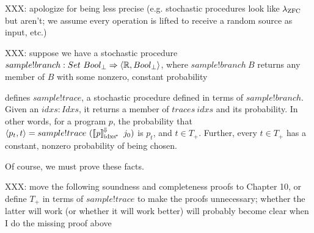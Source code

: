 XXX: apologize for being less precise (e.g. stochastic procedures look like $\lambda_{\text{ZFC}}$ but aren't; we assume every operation is lifted to receive a random source as input, etc.)

XXX: suppose we have a stochastic procedure $sample!branch : Set~Bool_\bot \Rightarrow \langle{\mathbb{R},Bool_\bot}\rangle$, where $sample!branch~B$ returns any member of $B$ with some nonzero, constant probability

 defines $sample!trace$, a stochastic procedure defined in terms of $sample!branch$.
Given an $idxs : Idxs$, it returns a member of $traces~idxs$ and its probability.
In other words, for a program $\mathit{p}$, the probability that $\langle{p_t,t}\rangle = sample!trace~(\left\llbracket{\mathit{p}}\right\rrbracket^{\mspace{-2mu}\Downarrow\mspace{-2mu}}_\mathrm{idxs^{\mspace{-2mu}*}}~j_0)$ is $p_t$, and $t \in T_+$.
Further, every $t \in T_+$ has a constant, nonzero probability of being chosen.

Of course, we must prove these facts.

XXX: move the following soundness and completeness proofs to Chapter 10, or define $T_+$ in terms of $sample!trace$ to make the proofs unnecessary; whether the latter will work (or whether it will work better) will probably become clear when I do the missing proof above

